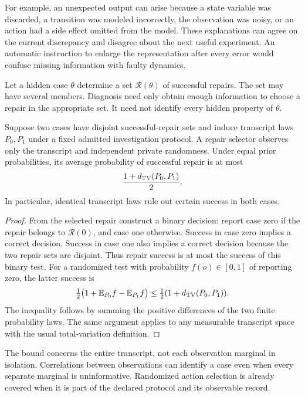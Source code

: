 For example, an unexpected output can arise because a state variable was discarded, a transition was modeled incorrectly, the observation was noisy, or an action had a side effect omitted from the model. These explanations can agree on the current discrepancy and disagree about the next useful experiment. An automatic instruction to enlarge the representation after every error would confuse missing information with faulty dynamics.

Let a hidden case $\theta$ determine a set $\mathcal R(\theta)$ of successful repairs. The set may have several members. Diagnosis need only obtain enough information to choose a repair in the appropriate set. It need not identify every hidden property of $\theta$.

\begin{SIIproposition}\label{SII:prop:indistinguishable}
Suppose two cases have disjoint successful-repair sets and induce transcript laws $P_0,P_1$ under a fixed admitted investigation protocol. A repair selector observes only the transcript and independent private randomness. Under equal prior probabilities, its average probability of successful repair is at most
\[
\frac{1+d_{\mathrm{TV}}(P_0,P_1)}2.
\]
In particular, identical transcript laws rule out certain success in both cases.
\end{SIIproposition}
\begin{proof}
From the selected repair construct a binary decision: report case zero if the repair belongs to $\mathcal R(0)$, and case one otherwise. Success in case zero implies a correct decision. Success in case one also implies a correct decision because the two repair sets are disjoint. Thus repair success is at most the success of this binary test. For a randomized test with probability $f(o)\in[0,1]$ of reporting zero, the latter success is
\[
\tfrac12\big(1+\mathbb E_{P_0}f-\mathbb E_{P_1}f\big)
\leq\tfrac12(1+d_{\mathrm{TV}}(P_0,P_1)).
\]
The inequality follows by summing the positive differences of the two finite probability laws. The same argument applies to any measurable transcript space with the usual total-variation definition.
\end{proof}

The bound concerns the entire transcript, not each observation marginal in isolation. Correlations between observations can identify a case even when every separate marginal is uninformative. Randomized action selection is already covered when it is part of the declared protocol and its observable record.

